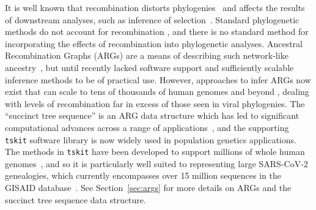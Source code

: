 \documentclass{article}
\begin{document}
It is well known that recombination distorts phylogenies~\citep{Schierup2000-fg}
and affects the results of downstream analyses, such as inference of
selection~\citep{Anisimova2003-vr}. Standard phylogenetic methods do
not account for recombination
\citep[e.g.,][]{Ronquist2012-zw,Minh2020-lr,Guindon2003-zd}, and there is
no standard method for incorporating the effects of recombination into
phylogenetic analyses.
Ancestral Recombination Graphs (ARGs) are a means of describing such
network-like ancestry~\citep{Griffiths1981-lw,Gusfield2014-qw}, but
until recently lacked software support and sufficiently scalable
inference methods to be of practical use.
However, approaches to infer ARGs now exist that can scale to tens of
thousands of human genomes and beyond
\citep{Speidel2019-yh,Kelleher2019-ba,Schaefer2021-yg,Zhang2023-lf}, dealing with levels of recombination far in excess of those seen in viral
phylogenies. The ``succinct tree sequence'' is an ARG data structure
which has led to significant computational advances across a range
of
applications~\citep{Kelleher2016-wk,Kelleher2018-xc,Kelleher2019-ba,Ralph2020-efficiently,
Wohns2022-th}, and the supporting \texttt{tskit} software library
is now widely used in population genetics applications.
The methods in \texttt{tskit} have been developed to support millions of
whole human genomes~\citep{Kelleher2019-ba}, and so it is particularly well suited
to representing large SARS-CoV-2 genealogies,
which currently encompasses over 15 million sequences in the GISAID
database~\citep{Shu2017-hp}.
See Section~\ref{sec:args} for more details on ARGs and the succinct
tree sequence data structure.
\end{document}
